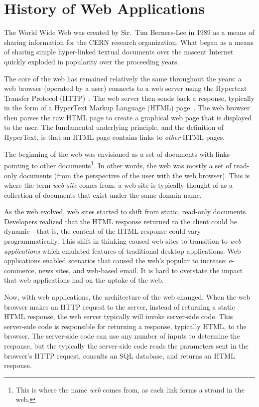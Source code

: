 \section{History of Web Applications}

The World Wide Web was created by Sir.\ Tim Berners-Lee in 1989 as a
means of sharing information for the CERN research organization. What
began as a means of sharing simple hyper-linked textual documents over
the nascent Internet quickly exploded in popularity over the
proceeding years.

The core of the web has remained relatively the same throughout the
years: a web browser (operated by a user) connects to a web server
using the Hypertext Transfer Protocol (HTTP)~\cite{fielding99:http11}.
The web server then sends back a response, typically in the form of a
HyperText Markup Language (HTML) page~\cite{berjon14:html5}. The web
browser then parses the raw HTML page to create a graphical web page that
is displayed to the user. The fundamental underlying principle, and
the definition of HyperText, is that an HTML page contains links to
\emph{other} HTML pages.

The beginning of the web was envisioned as a set of documents with
links pointing to other documents\footnote{This is where the name
  \emph{web} comes from, as each link forms a strand in the web.}. In
other words, the web was mostly a set of read-only documents (from the
perspective of the user with the web browser). This is where the term
\emph{web site} comes from: a web site is typically thought of as a
collection of documents that exist under the same domain name.

As the web evolved, web sites started to shift from static, read-only
documents. Developers realized that the HTML response returned to the
client could be dynamic---that is, the content of the HTML response
could vary programmatically. This shift in thinking caused web sites to
transition to \emph{web applications} which emulated features of
traditional desktop applications. Web applications enabled scenarios
that caused the web's popular to increase: e-commerce, news sites, and
web-based email. It is hard to overstate the impact that web
applications had on the uptake of the web. 

Now, with web applications, the architecture of the web changed. When
the web browser makes an HTTP request to the server, instead of
returning a static HTML response, the web server typically will invoke
server-side code. This server-side code is responsible for returning a
response, typically HTML, to the browser. The server-side code can use
any number of inputs to determine the response, but the typically the
server-side code reads the parameters sent in the browser's HTTP
request, consults an SQL database, and returns an HTML response.

